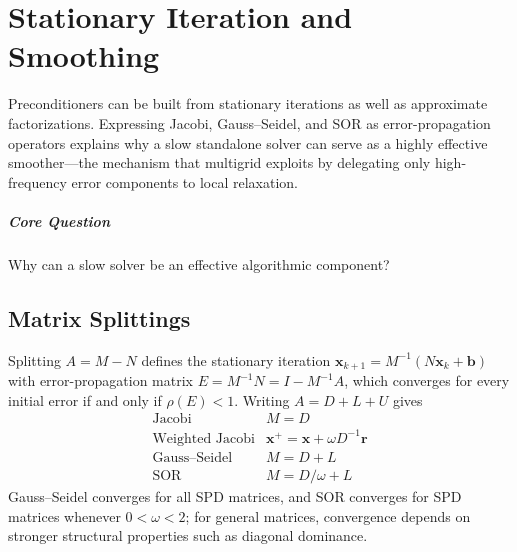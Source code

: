 \chapter{Stationary Iteration and Smoothing}\label{v0ch:17}
\begin{chaptersummary}
Preconditioners can be built from stationary iterations as well as approximate factorizations. Expressing Jacobi, Gauss--Seidel, and SOR as error-propagation operators explains why a slow standalone solver can serve as a highly effective smoother—the mechanism that multigrid exploits by delegating only high-frequency error components to local relaxation.
\end{chaptersummary}
\paragraph{Core Question}Why can a slow solver be an effective algorithmic component?

\section{Matrix Splittings}
Splitting $A=M-N$ defines the stationary iteration
$\bm x_{k+1}=M^{-1}(N\bm x_k+\bm b)$ with error-propagation matrix
$E=M^{-1}N=I-M^{-1}A$, which converges for every initial error if and only if $\rho(E)<1$.
Writing $A=D+L+U$ gives
\[
\begin{array}{c|c}
\text{Jacobi}&M=D\\
\text{Weighted Jacobi}&\bm x^+=\bm x+\omega D^{-1}\bm r\\
\text{Gauss--Seidel}&M=D+L\\
\text{SOR}&M=D/\omega+L
\end{array}
\]
Gauss--Seidel converges for all SPD matrices, and SOR converges for SPD matrices whenever $0<\omega<2$; for general matrices, convergence depends on stronger structural properties such as diagonal dominance.
